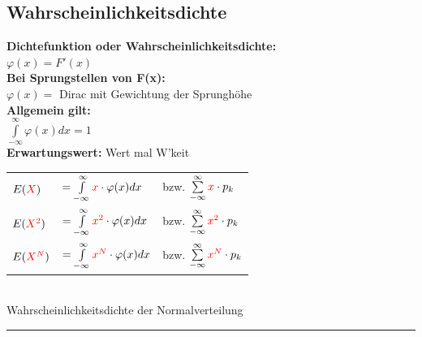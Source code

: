 \subsection{Wahrscheinlichkeitsdichte}
\begin{multicols}{2}
\textbf{Dichtefunktion oder Wahrscheinlichkeitsdichte:} \\
$\varphi(x) = F'(x)$ \\
\textbf{Bei Sprungstellen von F(x):} \\
$\varphi(x) = $ Dirac mit Gewichtung der Sprunghöhe\\
\textbf{Allgemein gilt:}\\
$\int\limits_{-\infty}^{\infty}\varphi (x) dx = 1$\\[1pt]

\textbf{Erwartungswert:} Wert mal W'keit\\
\begin{tabular}{l l l}
	$E(\textcolor{red}{X})$ &  
$ = \int\limits_{-\infty}^{\infty} \textcolor{red}{x} \cdot \varphi(x) dx$  & 
bzw. $\sum\limits_{-\infty}^{\infty} \textcolor{red}{x} \cdot p_k$\\

	$E(\textcolor{red}{X^2})$ & 
$ = \int\limits_{-\infty}^{\infty} \textcolor{red}{x^2} \cdot \varphi(x) dx$ & 
bzw. $\sum\limits_{-\infty}^{\infty} \textcolor{red}{x^2} \cdot p_k$\\

	$E(\textcolor{red}{X^N})$ & 
$ = \int\limits_{-\infty}^{\infty} \textcolor{red}{x^N} \cdot \varphi(x) dx$ 
& bzw. $\sum\limits_{-\infty}^{\infty} \textcolor{red}{x^N} \cdot p_k$
\end{tabular}

\columnbreak
\\
Wahrscheinlichkeitsdichte der Normalverteilung
\end{multicols}

\hrule


